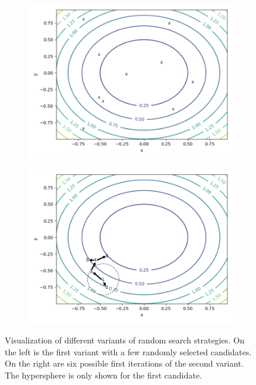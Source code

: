 \begin{figure}[ht!]
    \centering
    \begin{subfigure}{0.48\textwidth}
        \includegraphics[width=\textwidth]{gfx/Figures/Theory/RandomSearch.pdf}
    \end{subfigure}
    \begin{subfigure}{0.48\textwidth}
        \includegraphics[width=\textwidth]{gfx/Figures/Theory/RandomSearchHypersphere.pdf}
    \end{subfigure}
    \caption[Visualization of different variants of random search strategies.]{Visualization of different variants of random search strategies. On the left is the first variant with a few randomly selected candidates. On the right are six possible first iterations of the second variant. The hypersphere is only shown for the first candidate.}
    \label{fig:theory:random-search}
\end{figure}


